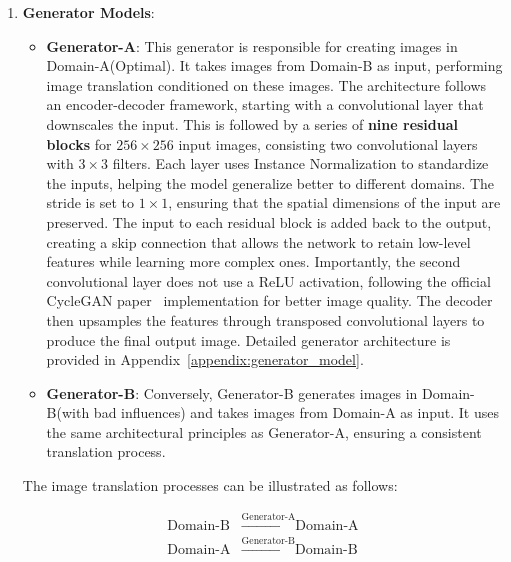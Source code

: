 \documentclass[12pt,DIV14,BCOR12mm,a4paper,footinclude=false,headinclude,parskip=half-,twoside,openright,cleardoublepage=empty,toc=index,bibliography=totoc,listof=totoc]{scrreprt}
\numberwithin{equation}{chapter}
\begin{document}
\begin{enumerate}
    \item \textbf{Generator Models}:
    \begin{itemize}
        \item \textbf{Generator-A}: This generator is responsible for creating images in Domain-A(Optimal). It takes images from Domain-B as input, performing image translation conditioned on these images. The architecture follows an encoder-decoder framework, starting with a convolutional layer that downscales the input. This is followed by a series of \textbf{nine residual blocks} for $256 \times 256$ input images, consisting two convolutional layers with $3 \times 3$ filters. Each layer uses Instance Normalization to standardize the inputs, helping the model generalize better to different domains. The stride is set to $1 \times 1$, ensuring that the spatial dimensions of the input are preserved. The input to each residual block is added back to the output, creating a skip connection that allows the network to retain low-level features while learning more complex ones. Importantly, the second convolutional layer does not use a ReLU activation, following the official CycleGAN paper~\cite{zhu2017unpaired} implementation for better image quality. The decoder then upsamples the features through transposed convolutional layers to produce the final output image. Detailed generator architecture is provided in Appendix~\ref{appendix:generator_model}.
        \item \textbf{Generator-B}: Conversely, Generator-B generates images in Domain-B(with bad influences) and takes images from Domain-A as input. It uses the same architectural principles as Generator-A, ensuring a consistent translation process.
    \end{itemize}

    The image translation processes can be illustrated as follows:

    \begin{align*}
    \text{Domain-B} & \xrightarrow{\text{Generator-A}} \text{Domain-A} \\
    \text{Domain-A} & \xrightarrow{\text{Generator-B}} \text{Domain-B}
    \end{align*}


\end{enumerate}
\end{document}
